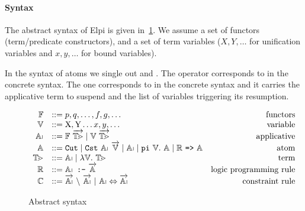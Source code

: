 \documentclass[a4paper, 11pt]{book}
\begin{document}
\paragraph{Syntax}
The abstract syntax of Elpi is given in~\cref{fig:syntax}.
We assume a set \PRED of functors (term/predicate constructors), and a set \VAR of term variables
($X,Y,\ldots$ for unification variables and $x,y,\ldots$ for bound variables).

In the syntax of atoms \ATOM we single out \cut and \cst.
The \cut operator corresponds to \elpi{!} in the concrete syntax.
The \cst one corresponds to  in the concrete syntax
and it carries the applicative term to suspend and the list of variables triggering
its resumption.





\begin{figure}
  $$
  \begin{array}{rlr}
    \PRED & ::= p, q, \ldots, f, g, \ldots & \mathrm{functors}\\
    \VAR & ::= \mathrm{X}, \mathrm{Y} \ldots x, y, \ldots & \mathrm{variable}\\
    \APP & ::= \PRED\ \vecL{\TERM} \mid  \VAR\ \vecL{\TERM} & \mathrm{applicative}\\
    \ATOM& ::= \cut \mid \cst\ \APP\ \vecL{\VAR} \mid \APP \mid \piCmd{\VAR}{\ATOM} \mid \implCmd{{\CLAUSE}}{\ATOM} & \mathrm{atom} \\
    \TERM & ::= \APP \mid \lambda \VAR \bs\ \TERM & \mathrm{term}\\
    \CLAUSE & ::= \clauseCmd{\APP}{\!}{\vecL{\ATOM}} & \mathrm{logic\ programming\ rule}\\
    \CHR & ::= \vecL{\APP}\ \backslash\ \vecL{\APP}\ 
               \mathrm{|}\ \APP \Leftrightarrow  \vecL{\APP} & \mathrm{constraint\ rule}
  \end{array}
  $$
  \caption{Abstract syntax}
  \label{fig:syntax}
\end{figure}
\end{document}
